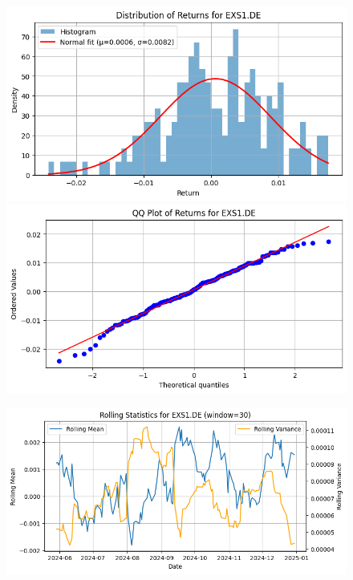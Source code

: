 \documentclass{article}%
\begin{document}
\begin{figure}[htbp]%
\begin{minipage}{0.49\textwidth}%
\includegraphics[width=\linewidth]{ticker_images/EXS1.DE_return_distribution.png}%
\end{minipage}%
\begin{minipage}{0.49\textwidth}%
\includegraphics[width=\linewidth]{ticker_images/EXS1.DE_qq_plot.png}%
\end{minipage}%
\end{figure}

%


\begin{figure}[htbp]%
\begin{minipage}{0.49\textwidth}%
\includegraphics[width=\linewidth]{ticker_images/EXS1.DE_rolling_stats.png}%
\end{minipage}%
\end{figure}
\end{document}
